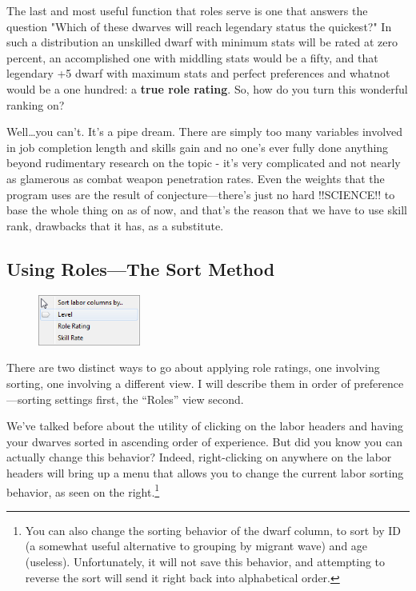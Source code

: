 \documentclass[]{article}
\begin{document}
The last and most useful function that roles serve is one that answers the question "Which of these
dwarves will reach legendary status the quickest?" In such a distribution an unskilled dwarf with minimum
stats will be rated at zero percent, an accomplished one with middling stats would be a fifty, and that
legendary +5 dwarf with maximum stats and perfect preferences and whatnot would be a one hundred: a
\textbf{true role rating}. So, how do you turn this wonderful ranking on?

Well\ldots you can't. It's a pipe dream. There are simply too many variables involved in job completion
length and skills gain and no one's ever fully done anything beyond rudimentary research on the topic -
it's very complicated and not nearly as glamerous as combat weapon penetration rates. Even the weights
that the program uses are the result of conjecture---there's just no hard !!SCIENCE!! to base the whole
thing on as of now, and that's the reason that we have to use skill rank, drawbacks that it has, as a
substitute.

\subsection{Using Roles---The Sort Method}
\label{sec:Using Roles}

\begin{figure}\vspace{-22pt}
  \begin{center}
    \includegraphics[width=0.3\textwidth]{Sec3Fig2}
  \end{center}
\vspace{-15pt}
\end{figure}
There are two distinct ways to go about applying role ratings, one involving sorting, one involving a
different view. I will describe them in order of preference---sorting settings first, the ``Roles'' view
second.

We've talked before about the utility of clicking on the labor headers and having your dwarves sorted in
ascending order of experience. But did you know you can actually change this behavior? Indeed,
right-clicking on anywhere on the labor headers will bring up a menu that allows you to change the
current labor sorting behavior, as seen on the right.\footnote{You can also change the sorting behavior
of the dwarf column, to sort by ID (a somewhat useful alternative to grouping by migrant wave) and age
(useless). Unfortunately, it will not save this behavior, and attempting to reverse the sort will send it
right back into alphabetical order.}
\end{document}
